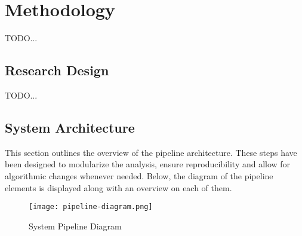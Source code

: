 \chapter{Methodology}
\label{sec:Method}
\label{Chapter3} %

TODO...

\section{Research Design}
TODO...

\section{System Architecture}

This section outlines the overview of the pipeline architecture. These steps have been designed to
modularize the analysis, ensure reproducibility and allow for algorithmic changes whenever needed.
Below, the diagram of the pipeline elements is displayed along with an overview on each of them.

\begin{figure}[htbp]
    \centering
    \texttt{[image: pipeline-diagram.png]}
    \caption{System Pipeline Diagram}
    \label{fig:pipeline_diagram}
\end{figure}

\FloatBarrier

